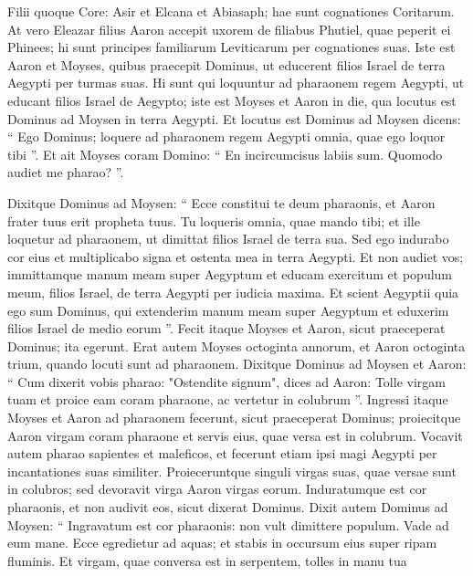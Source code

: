 \begin{biblechapter}
\begin{biblechapter}
\begin{biblechapter}
\begin{biblechapter}
\begin{biblechapter}
\begin{biblechapter}
 \verse Filii quoque Core: Asir et Elcana et Abiasaph; hae sunt cognationes Coritarum.
 \verse At vero Eleazar filius Aaron accepit uxorem de filiabus Phutiel, quae peperit ei Phinees; hi sunt principes familiarum Leviticarum per cognationes suas.
 \verse Iste est Aaron et Moyses, quibus praecepit Dominus, ut educerent filios Israel de terra Aegypti per turmas suas. 
\verse Hi sunt qui loquuntur ad pharaonem regem Aegypti, ut educant filios Israel de Aegypto; iste est Moyses et Aaron 
\verse in die, qua locutus est Dominus ad Moysen in terra Aegypti.
 \verse Et locutus est Dominus ad Moysen dicens: “ Ego Dominus; loquere ad pharaonem regem Aegypti omnia, quae ego loquor tibi ”. 
\verse Et ait Moyses coram Domino: “ En incircumcisus labiis sum. Quomodo audiet me pharao? ”.
 
\begin{biblechapter}
\verse Dixitque Dominus ad Moysen: “ Ecce constitui te deum pharaonis, et Aaron frater tuus erit propheta tuus. 
\verse Tu loqueris omnia, quae mando tibi; et ille loquetur ad pharaonem, ut dimittat filios Israel de terra sua. 
\verse Sed ego indurabo cor eius et multiplicabo signa et ostenta mea in terra Aegypti. 
 \verse Et non audiet vos; immittamque manum meam super Aegyptum et educam exercitum et populum meum, filios Israel, de terra Aegypti per iudicia maxima. 
\verse Et scient Aegyptii quia ego sum Dominus, qui extenderim manum meam super Aegyptum et eduxerim filios Israel de medio eorum ”.
 \verse Fecit itaque Moyses et Aaron, sicut praeceperat Dominus; ita egerunt. 
\verse Erat autem Moyses octoginta annorum, et Aaron octoginta trium, quando locuti sunt ad pharaonem.
 \verse Dixitque Dominus ad Moysen et Aaron: 
\verse “ Cum dixerit vobis pharao: "Ostendite signum", dices ad Aaron: Tolle virgam tuam et proice eam coram pharaone, ac vertetur in colubrum ”. 
\verse Ingressi itaque Moyses et Aaron ad pharaonem fecerunt, sicut praeceperat Dominus; proiecitque Aaron virgam coram pharaone et servis eius, quae versa est in colubrum.
 \verse Vocavit autem pharao sapientes et maleficos, et fecerunt etiam ipsi magi Aegypti per incantationes suas similiter. 
\verse Proieceruntque singuli virgas suas, quae versae sunt in colubros; sed devoravit virga Aaron virgas eorum. 
 \verse Induratumque est cor pharaonis, et non audivit eos, sicut dixerat Dominus.
 \verse Dixit autem Dominus ad Moysen: “ Ingravatum est cor pharaonis: non vult dimittere populum. 
\verse Vade ad eum mane. Ecce egredietur ad aquas; et stabis in occursum eius super ripam fluminis. Et virgam, quae conversa est in serpentem, tolles in manu tua 

\end{biblechapter}
\end{biblechapter}
\end{biblechapter}
\end{biblechapter}
\end{biblechapter}
\end{biblechapter}
\end{biblechapter}

